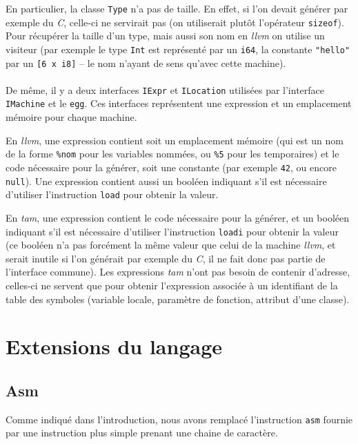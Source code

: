 \documentclass{scrartcl}
\newcommand{\egg} {\texttt{egg}}
\newcommand{\llvm}{\textit{llvm}}
\newcommand{\tam} {\textit{tam}}
\begin{document}
  En particulier, la classe \verb+Type+ n'a pas de taille. En effet, si l'on
  devait générer par exemple du \textit{C}, celle-ci ne servirait pas (on
  utiliserait plutôt l'opérateur \verb+sizeof+). Pour récupérer la taille d'un
  type, mais aussi son nom en \llvm{} on utilise un visiteur (par exemple le
  type \verb+Int+ est représenté par un \verb+i64+, la constante \verb+"hello"+
  par un \verb+[6 x i8]+ -- le nom n'ayant de sens qu'avec cette machine).

  \paragraph{}
  De même, il y a deux interfaces \verb+IExpr+ et \verb+ILocation+ utilisées
  par l'interface \verb+IMachine+ et le \egg{}. Ces interfaces représentent
  une expression et un emplacement mémoire pour chaque machine.

  En \llvm{}, une expression contient soit un emplacement mémoire (qui est un
  nom de la forme \verb+%nom+ pour les variables nommées, ou \verb+%5+ pour les
  temporaires) et le code nécessaire pour la générer, soit une constante (par
  exemple \verb+42+, ou encore \verb+null+). Une expression contient aussi un
  booléen indiquant s'il est nécessaire d'utiliser l'instruction \verb+load+
  pour obtenir la valeur.

  En \tam{}, une expression contient le code nécessaire pour la générer, et un
  booléen indiquant s'il est nécessaire d'utiliser l'instruction \verb+loadi+
  pour obtenir la valeur (ce booléen n'a pas forcément la même valeur que
  celui de la machine \llvm{}, et serait inutile si l'on générait par exemple
  du \textit{C}, il ne fait donc pas partie de l'interface commune). Les
  expressions \tam{} n'ont pas besoin de contenir d'adresse, celles-ci ne
  servent que pour obtenir l'expression associée à un identifiant de la table
  des symboles (variable locale, paramètre de fonction, attribut d'une classe).

\section{Extensions du langage}
  \subsection{Asm}
    Comme indiqué dans l'introduction, nous avons remplacé l'instruction
    \verb+asm+ fournie par une instruction plus simple prenant une chaine de
    caractère.
\end{document}
